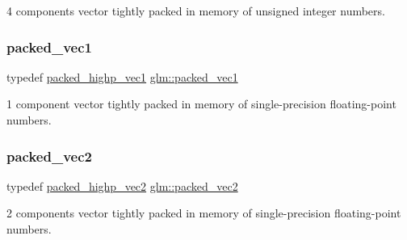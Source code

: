 4 components vector tightly packed in memory of unsigned integer numbers. 

\mbox{\label{group__gtc__type__aligned_ga1722068e0357aca709e5002f20cc043f}} 
\subsubsection{\texorpdfstring{packed\+\_\+vec1}{packed\_vec1}}
{\footnotesize\ttfamily typedef \hyperlink{group__gtc__type__aligned_ga0356e10a8b10f699cf7cf4308f449c83}{packed\+\_\+highp\+\_\+vec1} \hyperlink{group__gtc__type__aligned_ga1722068e0357aca709e5002f20cc043f}{glm\+::packed\+\_\+vec1}}



1 component vector tightly packed in memory of single-\/precision floating-\/point numbers. 

\mbox{\label{group__gtc__type__aligned_ga702841b8b37825c9a51d95bc0f7848b2}} 
\subsubsection{\texorpdfstring{packed\+\_\+vec2}{packed\_vec2}}
{\footnotesize\ttfamily typedef \hyperlink{group__gtc__type__aligned_ga15068ebf3dae2c205d90b1d36780bf9b}{packed\+\_\+highp\+\_\+vec2} \hyperlink{group__gtc__type__aligned_ga702841b8b37825c9a51d95bc0f7848b2}{glm\+::packed\+\_\+vec2}}



2 components vector tightly packed in memory of single-\/precision floating-\/point numbers. 

\mbox{\label{group__gtc__type__aligned_ga8e23eba0ebe21b912cd783f69fa3a99b}} 

